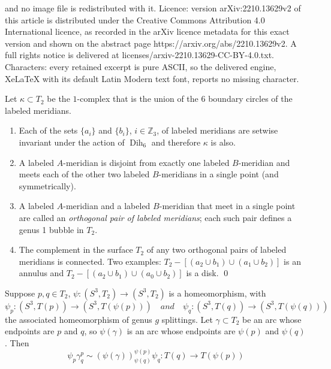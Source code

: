 \documentclass[10pt,a4paper]{amsart}
\def\zed{{\mathbb Z}}
\newcommand{\Dih}{\operatorname{Dih}}
\begin{document}
and no image file is redistributed with it. Licence: version arXiv:2210.13629v2 of this article is distributed under the Creative Commons Attribution 4.0 International licence, as recorded in the arXiv licence metadata for this exact version and shown on the abstract page https://arxiv.org/abs/2210.13629v2. A full rights notice is delivered at licenses/arxiv-2210.13629-CC-BY-4.0.txt. Characters: every retained excerpt is pure ASCII, so the delivered engine, XeLaTeX with its default Latin Modern text font, reports no missing character.
\begin{lemma} \label{lemma:Kdef}  Let $\kappa \subset T_2$ be the $1$-complex that is the union of the 6 boundary circles of the labeled meridians.  
\begin{enumerate}
\item Each of the sets  $\{a_i\}$ and  $\{b_i\}$, $ i \in \zed_3$, of labeled meridians are  setwise invariant under the action of $\Dih_6$ and therefore $\kappa$ is also. 
\item A labeled $A$-meridian is disjoint from exactly one labeled $B$-meridian and meets each of the other two labeled $B$-meridians in a single point (and symmetrically).  
\item A labeled $A$-meridian and a labeled $B$-meridian that meet in a single point are called an {\em orthogonal pair of labeled meridians}; each such pair defines a genus 1 bubble in $T_2$.  
\item The complement in the surface $T_2$ of any two orthogonal pairs of labeled meridians is connected. Two examples: $T_2 - [(a_2 \cup b_1) \cup (a_1 \cup b_2)]$ is an annulus and $T_2 - [(a_2 \cup b_1) \cup (a_0 \cup b_2)]$ is a disk. \qed
\end{enumerate} 
\end{lemma}  

\begin{lemma} \label{lemma:homeocommute}  Suppose $p, q \in T_2$, $\psi: (S^3, T_2) \to (S^3, T_2)$ is a homeomorphism, with \[\psi_p: (S^3, T(p)) \to (S^3, T({\psi(p)})) \quad and \quad \psi_q: (S^3, T(q)) \to (S^3, T({\psi(q)}))\] the associated homeomorphism of genus $g$ splittings.  Let $\gamma \subset T_2$ be an arc whose endpoints are $p$ and $q$, so $\psi(\gamma)$ is an arc whose endpoints are  $\psi(p)$ and $\psi(q)$.   Then 
\[ \psi_p \gamma^p_q \sim (\psi(\gamma))^{\psi(p)}_{\psi(q)} \psi_q   :T(q) \to T({\psi(p)}) \]
\end{lemma}
\end{document}

